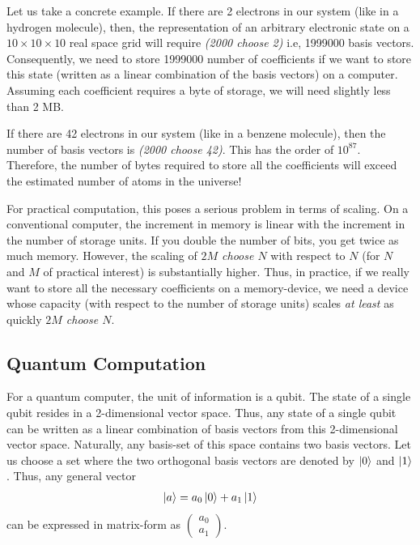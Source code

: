 \documentclass[12pt,oneside]{book}
\begin{document}
Let us take a concrete example. If there are 2 electrons in our system (like in a hydrogen molecule), then, the representation of an arbitrary electronic state on a $10 \times 10 \times 10$ real space grid will require \textit{(2000 choose 2)} i.e, 1999000 basis vectors. Consequently, we need to store 1999000 number of coefficients if we want to store this state (written as a linear combination of the basis vectors) on a computer. Assuming each coefficient requires a byte of storage, we will need slightly less than 2 MB. 

If there are 42 electrons in our system (like in a benzene molecule), then the number of basis vectors is \textit{(2000 choose 42)}. This has the order of $10^{87}$. Therefore, the number of bytes required to store all the coefficients will exceed the estimated number of atoms in the universe!

For practical computation, this poses a serious problem in terms of scaling. On a conventional computer, the increment in memory is linear with the increment in the number of storage units. If you double the number of bits, you get twice as much memory. However, the scaling of \textit{$2M$ choose $N$} with respect to $N$ (for $N$ and $M$ of practical interest) is substantially higher. Thus, in practice, if we really want to store all the necessary coefficients on a memory-device, we need a device whose capacity (with respect to the number of storage units) scales \textit{at least} as quickly \textit{$2M$ choose $N$}.


    
    

\subsection*{Quantum Computation}

For a quantum computer, the unit of information is a qubit. The state of a single qubit resides in a 2-dimensional vector space. Thus, any state of a single qubit can be written as a linear combination of basis vectors from this 2-dimensional vector space. Naturally, any basis-set of this space contains two basis vectors. Let us choose a set where the two orthogonal basis vectors are denoted by $\ket{0}$ and $\ket{1}$. Thus, any general vector 
\begin{align}\label{Eq1}
    \ket{a}=a_0\ket{0}+a_1\ket{1}
\end{align}
can be expressed in matrix-form as $\begin{pmatrix}
        a_0\\
        a_1
    \end{pmatrix}$.
\end{document}
